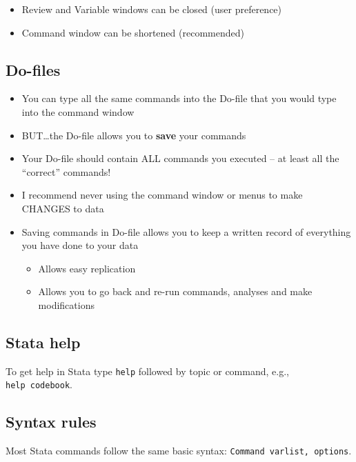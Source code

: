 \documentclass[
]{book}
\providecommand{\tightlist}{%
  \setlength{\itemsep}{0pt}\setlength{\parskip}{0pt}}
\begin{document}
\begin{itemize}
\tightlist
\item
  Review and Variable windows can be closed (user preference)
\item
  Command window can be shortened (recommended)
\end{itemize}

\hypertarget{do-files}{%
\subsection{Do-files}\label{do-files}}

\begin{itemize}
\tightlist
\item
  You can type all the same commands into the Do-file that you would type into the command window
\item
  BUT\ldots the Do-file allows you to \textbf{save} your commands
\item
  Your Do-file should contain ALL commands you executed -- at least all the ``correct'' commands!
\item
  I recommend never using the command window or menus to make CHANGES to data
\item
  Saving commands in Do-file allows you to keep a written record of everything you have done to your data

  \begin{itemize}
  \tightlist
  \item
    Allows easy replication
  \item
    Allows you to go back and re-run commands, analyses and make modifications
  \end{itemize}
\end{itemize}

\hypertarget{stata-help}{%
\subsection{Stata help}\label{stata-help}}

To get help in Stata type \texttt{help} followed by topic or command, e.g., \texttt{help\ codebook}.

\hypertarget{syntax-rules-1}{%
\subsection{Syntax rules}\label{syntax-rules-1}}

Most Stata commands follow the same basic syntax: \texttt{Command\ varlist,\ options}.
\end{document}

